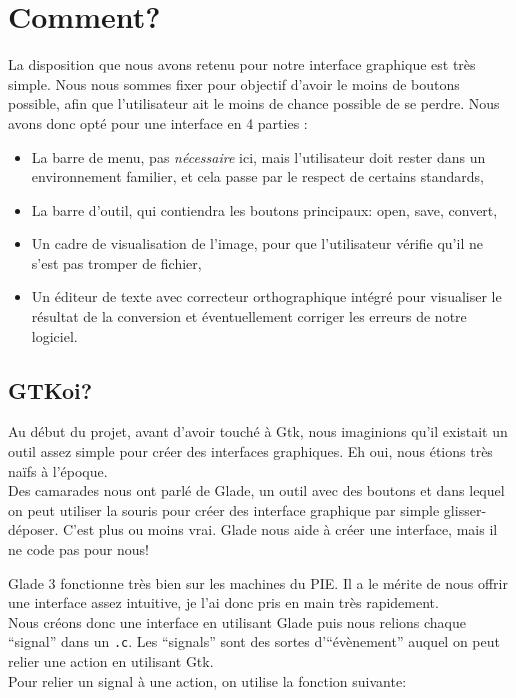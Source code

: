 \documentclass[a4paper,12pt]{report}
\begin{document}

\pagebreak

\section{Comment?} %
\label{sec:comment_}
La disposition que nous avons retenu pour notre interface graphique est très simple. Nous nous sommes fixer pour objectif d’avoir le moins de boutons possible, afin que l’utilisateur ait le moins de chance possible de se perdre.
Nous avons donc opté pour une interface en 4 parties :\\

\begin{itemize}
	\item La barre de menu, pas \emph{nécessaire} ici, mais l’utilisateur doit rester dans un environnement familier, et cela passe par le respect de certains standards,
	\item La barre d’outil, qui contiendra les boutons principaux: open, save, convert,
	\item Un cadre de visualisation de l’image, pour que l’utilisateur vérifie qu’il ne s’est pas tromper de fichier,
	\item Un éditeur de texte avec correcteur orthographique intégré pour visualiser le résultat de la conversion et éventuellement corriger les erreurs de notre logiciel.
\end{itemize}



\subsection{GTKoi?} %
\label{sec:gtkoi_}
Au début du projet, avant d’avoir touché à Gtk, nous imaginions qu’il existait un outil assez simple pour créer des interfaces graphiques. Eh oui, nous étions très naïfs à l’époque. \\
Des camarades nous ont parlé de Glade, un outil avec des boutons et dans lequel on peut utiliser la souris pour créer des interface graphique par simple glisser-déposer. C'est plus ou moins vrai. Glade nous aide à créer une interface, mais il ne code pas pour nous!

Glade 3 fonctionne tr\`es bien sur les machines du PIE. Il a le m\'erite de nous offrir une interface assez intuitive, je l'ai donc pris en main tr\`es rapidement.\\
Nous cr\'eons donc une interface en utilisant Glade puis nous relions chaque ``signal'' dans un \texttt{.c}. Les ``signals'' sont des sortes d'``\'ev\`enement'' auquel on peut relier une action en utilisant Gtk.\\
Pour relier un signal \`a une action, on utilise la fonction suivante:
\end{document}
